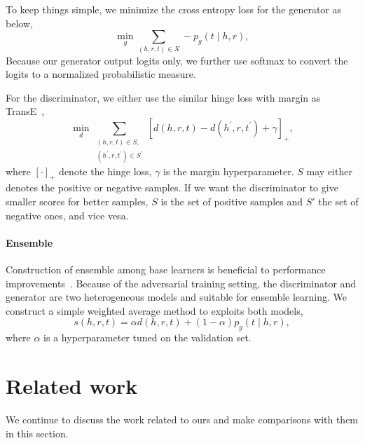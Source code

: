 \documentclass[twocolumn,a4paper,preprint,10pt,3p]{elsarticle}
\begin{document}
To keep things simple, we minimize the cross entropy loss for the generator as below,
\begin{equation}
    \min_g \sum_{(h, r, t)\in X} -p_g(t \mid h, r), \label{eq:g_pretrain}
\end{equation}
Because our generator output logits only, we further use softmax to convert the logits to a normalized probabilistic measure.

For the discriminator, we either use the similar hinge loss with margin as TransE~\cite{TransE2013},
\begin{equation}
    \min_d \sum_{\substack{(h, r, t)\in S,\\ (h^\prime, r, t^\prime)\in S^\prime }}
        {[ d(h, r, t) - d(h^\prime, r, t^\prime) + \gamma ]}_+, \label{eq:d_pretrain}
\end{equation}
where ${[\cdot]}_+$ denote the hinge loss, $\gamma$ is the margin hyperparameter. $S$ may either denotes the positive or negative samples. If we want the discriminator to give smaller scores for better samples, $S$ is the set of positive samples and $S'$ the set of negative ones, and vice vesa.

\paragraph{Ensemble} Construction of ensemble among base learners is beneficial to performance improvements~\cite{dietterich2000ensemble}. Because of the adversarial training setting, the discriminator and generator are two heterogeneous models and suitable for ensemble learning. We construct a simple weighted average method to exploits both models,
\begin{equation}
    s(h, r, t) = \alpha d(h, r, t) + (1 - \alpha) p_g(t \mid h, r), \label{eq:weighted-ensemble}
\end{equation}
where $\alpha$ is a hyperparameter tuned on the validation set.


\section{Related work}

We continue to discuss the work related to ours and make comparisons with them in this section.
\end{document}
